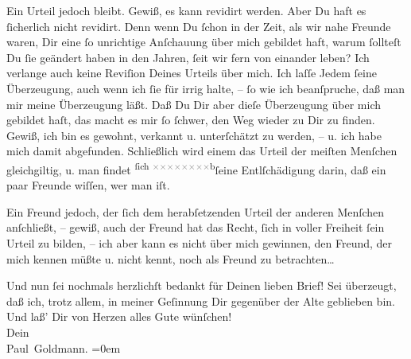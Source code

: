 \pstart
           Ein Urteil jedoch bleibt. Gewiß, es kann revidirt werden. Aber Du haft es ſicherlich
               nicht revidirt. Denn wenn Du ſchon in der Zeit, als wir nahe Freunde waren, Dir eine
               ſo unrichtige Anſchauung über mich {\pb}gebildet
               haft, warum ſollteſt Du ſie geändert haben in den Jahren, ſeit wir fern von einander
               leben? Ich verlange auch keine Reviſion Deines Urteils über mich. Ich laſſe Jedem
               ſeine Überzeugung, auch wenn ich ſie für irrig halte, – ſo wie ich beanſpruche, daß
               man mir meine Überzeugung läßt. Daß Du Dir aber dieſe Überzeugung über mich gebildet
               haſt, das macht es mir ſo ſchwer, den Weg wieder zu Dir zu finden. Gewiß, ich bin es
               gewohnt, verkannt u. unterſchätzt {\pb}zu werden, –
               u. ich habe mich damit abgefunden. Schließlich wird einem das Urteil der meiſten
               Menſchen gleichgiltig, u. man findet \substVorne{}\textsuperscript{ſich \textcolor{gray}{×}\-\textcolor{gray}{×}\-\textcolor{gray}{×}\-\textcolor{gray}{×}\-\textcolor{gray}{×}\-\textcolor{gray}{×}\-\textcolor{gray}{×}\-\textcolor{gray}{×}b}{\allowbreak}\substDazwischen{}ſeine Entlſchädigung darin\substHinten{}, daß ein paar Freunde wiſſen, wer man iſt.\pend
           
\pstart
           Ein Freund jedoch, 
               der ſich dem herabſetzenden Urteil der anderen Menſchen anſchließt, – gewiß,
               auch der Freund hat das Recht, ſich in voller Freiheit ſein Urteil zu bilden, – ich
               aber kann es nicht über mich {\pb}gewinnen, den
               Freund, der mich kennen müßte u. nicht kennt, noch als Freund zu betrachten{\dots}\pend
           
\pstart
           Und nun ſei nochmals herzlichſt bedankt für Deinen lieben Brief! Sei überzeugt,
               daß ich, trotz allem, in meiner Geſinnung Dir gegenüber der Alte geblieben bin. Und
               laß’ Dir von Herzen alles Gute wünſchen! {\\[\baselineskip]}Dein {\\[\baselineskip]}\spacefill\mbox{Paul Goldmann.}\pend
           \leftskip=0em{}\endnumbering{}  
      